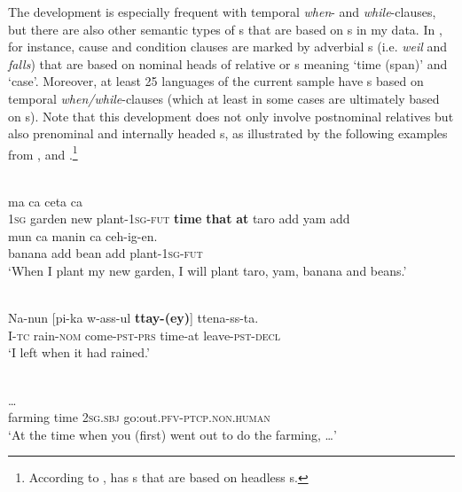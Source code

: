 \documentclass[output=paper]{langsci/langscibook}
\begin{document}
The development is especially frequent with temporal \textit{when}- and \textit{while}-clauses, but there are also other semantic types of s that are based on s in my data. In , for instance, cause and condition clauses are marked by adverbial s (i.e. \textit{weil} and \textit{falls}) that are based on nominal heads of relative or s meaning ‘time (span)’ and ‘case’. Moreover, at least 25 languages of the current sample have s based on temporal \textit{when/while}-clauses (which at least in some cases are ultimately based on s). Note that this development does not only involve postnominal relatives but also prenominal and internally headed s, as illustrated by the following examples from  ,   and  .\footnote{According to \citet{Epps2009_RC},  has s that are based on headless s.} 

\ea\label{ex:diessel:12}
\\
   ma   ca  ceta  ca\\
        1\textsc{sg}   garden   new   plant-1\textsc{sg-fut}   \textbf{time}   \textbf{that}    \textbf{at}   taro   add  yam  add  \\
\gll   mun    ca    manin    ca  ceh-ig-en.\\
       banana   add bean    add  plant-\textsc{1sg-fut}\\
\glt `When I plant my new garden, I will plant taro, yam, banana and beans.'
\z

\ea\label{ex:diessel:13}
\\
\gll   Na-nun  [pi-ka  w-ass-ul   \textbf{ttay-(ey)}]    ttena-ss-ta.\\
       I-\textsc{tc}  rain-\textsc{nom}  come-\textsc{pst-prs}  time-at     leave-\textsc{pst-decl}\\
\glt   `I left when it had rained.' 
\z

\ea\label{ex:diessel:14}
\\
 …\\
       farming  time   2\textsc{sg.sbj}  go:out.\textsc{pfv}-\textsc{ptcp.non.human} \\
\glt   `At the time when you (first) went out to do the farming, …'
\z
\end{document}
